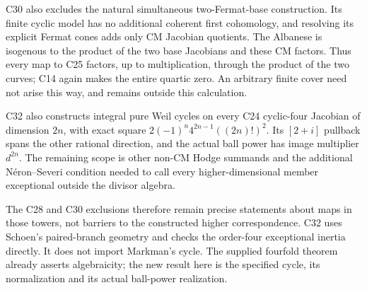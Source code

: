 C30 also excludes the natural simultaneous two-Fermat-base
construction. Its finite cyclic model has no additional
coherent first cohomology, and resolving its explicit Fermat
cones adds only CM Jacobian quotients. The Albanese is
isogenous to the product of the two base Jacobians and these
CM factors. Thus every map to C25 factors, up to multiplication,
through the product of the two curves; C14 again makes the
entire quartic zero. An arbitrary finite cover need not arise
this way, and remains outside this calculation.

C32 also constructs integral pure Weil cycles on every C24
cyclic-four Jacobian of dimension $2n$, with exact square
$2(-1)^n4^{2n-1}((2n)!)^2$. Its $[2+i]$ pullback spans
the other rational direction, and the actual ball power has
image multiplier $d^{2n}$. The remaining scope is other
non-CM Hodge summands and the additional N\'eron--Severi
condition needed to call every higher-dimensional member
exceptional outside the divisor algebra.

The C28 and C30 exclusions therefore remain precise statements
about maps in those towers, not barriers to the constructed
higher correspondence. C32 uses Schoen's paired-branch geometry
and checks the order-four exceptional inertia directly. It
does not import Markman's cycle. The supplied fourfold theorem
already asserts algebraicity; the new result here is the
specified cycle, its normalization and its actual ball-power
realization.

